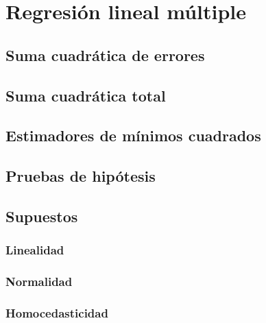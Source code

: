 \documentclass[
]{book}
\theoremstyle{definition}
\theoremstyle{definition}
\theoremstyle{definition}
\theoremstyle{definition}
\theoremstyle{remark}
\begin{document}
\hypertarget{regresiuxf3n-lineal-muxfaltiple}{%
\section{Regresión lineal múltiple}\label{regresiuxf3n-lineal-muxfaltiple}}

\hypertarget{suma-cuadruxe1tica-de-errores-1}{%
\subsection{Suma cuadrática de errores}\label{suma-cuadruxe1tica-de-errores-1}}

\hypertarget{suma-cuadruxe1tica-total}{%
\subsection{Suma cuadrática total}\label{suma-cuadruxe1tica-total}}

\hypertarget{estimadores-de-muxednimos-cuadrados-1}{%
\subsection{Estimadores de mínimos cuadrados}\label{estimadores-de-muxednimos-cuadrados-1}}

\hypertarget{pruebas-de-hipuxf3tesis-2}{%
\subsection{Pruebas de hipótesis}\label{pruebas-de-hipuxf3tesis-2}}

\hypertarget{supuestos-1}{%
\subsection{Supuestos}\label{supuestos-1}}

\hypertarget{linealidad-1}{%
\subsubsection*{Linealidad}\label{linealidad-1}}

\hypertarget{normalidad-1}{%
\subsubsection*{Normalidad}\label{normalidad-1}}

\hypertarget{homocedasticidad-1}{%
\subsubsection*{Homocedasticidad}\label{homocedasticidad-1}}
\end{document}
